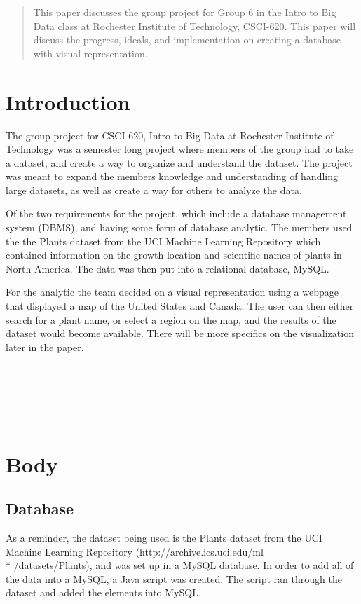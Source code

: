 \documentclass{Group6_Phase2}
\begin{document}
\maketitle
\begin{abstract}
This paper discusses the group project for Group 6 in the Intro to Big Data class at Rochester Institute of Technology, CSCI-620. This paper will discuss the progress, ideals, and implementation on creating a database with visual representation.
\end{abstract}


\section{Introduction}
The group project for CSCI-620, Intro to Big Data at Rochester Institute of Technology was a semester long project where members of the group had to take a dataset, and create a way to organize and understand the dataset. The project was meant to expand the members knowledge and understanding of handling large datasets, as well as create a way for others to analyze the data.

Of the two requirements for the project, which include a database management system (DBMS), and having some form of database analytic. The members used the the Plants dataset from the UCI Machine Learning Repository which contained information on the growth location and scientific names of plants in North America. The data was then put into a relational database, MySQL. 

For the analytic the team decided on a visual representation using a webpage that displayed a map of the United States and Canada. The user can then either search for a plant name, or select a region on the map, and the results of the dataset would become available. There will be more specifics on the visualization later in the paper.  
\\\\\\\\\\\\

\section{Body}

\subsection{Database}
 As a reminder, the dataset being used is the Plants dataset from the UCI Machine Learning Repository (http://archive.ics.uci.edu/ml \\* /datasets/Plants), and was set up in a MySQL database. In order to add all of the data into a MySQL, a Java script was created. The script ran through the dataset and added the elements into MySQL. 
 
\end{document}

